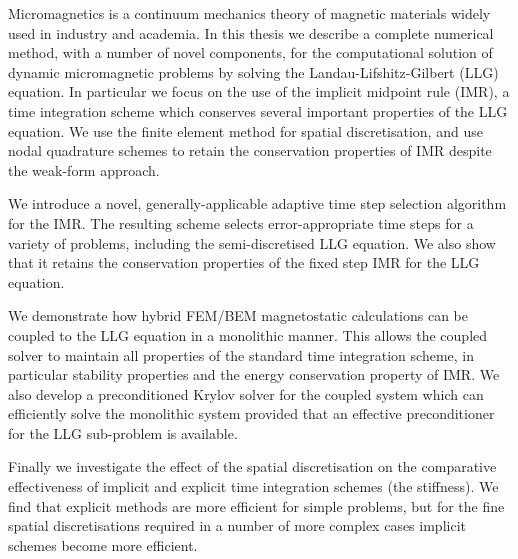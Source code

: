 Micromagnetics is a continuum mechanics theory of magnetic materials widely used in industry and academia.
In this thesis we describe a complete numerical method, with a number of novel components, for the computational solution of dynamic micromagnetic problems by solving the Landau-Lifshitz-Gilbert (LLG) equation.
In particular we focus on the use of the implicit midpoint rule (IMR), a time integration scheme which conserves several important properties of the LLG equation.
We use the finite element method for spatial discretisation, and use nodal quadrature schemes to retain the conservation properties of IMR despite the weak-form approach.

We introduce a novel, generally-applicable adaptive time step selection algorithm for the IMR.
The resulting scheme selects error-appropriate time steps for a variety of problems, including the semi-discretised LLG equation.
We also show that it retains the conservation properties of the fixed step IMR for the LLG equation.

We demonstrate how hybrid FEM/BEM magnetostatic calculations can be coupled to the LLG equation in a monolithic manner.
This allows the coupled solver to maintain all properties of the standard time integration scheme, in particular stability properties and the energy conservation property of IMR.
We also develop a preconditioned Krylov solver for the coupled system which can efficiently solve the monolithic system provided that an effective preconditioner for the LLG sub-problem is available.

Finally we investigate the effect of the spatial discretisation on the comparative effectiveness of implicit and explicit time integration schemes (\ie the stiffness).
We find that explicit methods are more efficient for simple problems, but for the fine spatial discretisations required in a number of more complex cases implicit schemes become more efficient.

